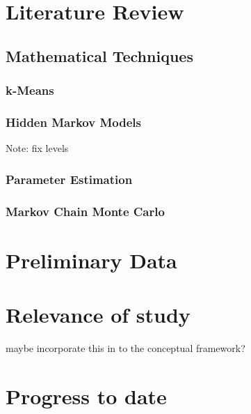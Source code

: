 \documentclass[12pt,a4paper]{article}
\author{D Maderazo}
\begin{document}
    
    \section{Literature Review}
    
        \subsection{Mathematical Techniques}
        \subsubsection{k-Means}
        
        \subsubsection{Hidden Markov Models}
        Note: fix levels
        
         
        
        \subsubsection{Parameter Estimation}
        
        
        \subsubsection{Markov Chain Monte Carlo}
        
            
            
        
    \section{Preliminary Data}
    \section{Relevance of study}
        maybe incorporate this in to the conceptual framework?
        
    \section{Progress to date}
    
    

\end{document}
